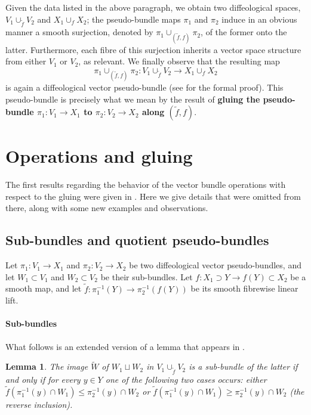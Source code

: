 \documentclass{article}
\newtheorem{lemma}{Lemma}[section]
\begin{document}
Given the data listed in the above paragraph, we obtain two diffeological spaces, $V_1\cup_{\tilde{f}}V_2$ and $X_1\cup_f X_2$; the pseudo-bundle maps $\pi_1$ and $\pi_2$ induce in an obvious
manner a smooth surjection, denoted by $\pi_1\cup_{(\tilde{f},f)}\pi_2$, of the former onto the latter. Furthermore, each fibre of this surjection inherits a vector space structure from either $V_1$ or $V_2$, as 
relevant. We finally observe that the resulting map
$$\pi_1\cup_{(\tilde{f},f)}\pi_2:V_1\cup_{\tilde{f}}V_2\to X_1\cup_f X_2$$ is again a diffeological vector pseudo-bundle (see \cite{pseudobundles} for the formal proof). This pseudo-bundle is precisely what 
we mean by the result of \textbf{gluing the pseudo-bundle $\pi_1:V_1\to X_1$ to $\pi_2:V_2\to X_2$ along $(\tilde{f},f)$}.



\section{Operations and gluing}

The first results regarding the behavior of the vector bundle operations with respect to the gluing were given in \cite{pseudobundles}. Here we give details that were omitted from there, along with some new 
examples and observations.

\subsection{Sub-bundles and quotient pseudo-bundles}

Let $\pi_1:V_1\to X_1$ and $\pi_2:V_2\to X_2$ be two diffeological vector pseudo-bundles, and let $W_1\subset V_1$ and $W_2\subset V_2$ be their sub-bundles. Let $f:X_1\supset Y\to f(Y)\subset X_2$ be 
a smooth map, and let $\tilde{f}:\pi_1^{-1}(Y)\to\pi_2^{-1}(f(Y))$ be its smooth fibrewise linear lift.

\paragraph{Sub-bundles} What follows is an extended version of a lemma that appears in \cite{pseudobundles}.

\begin{lemma}
The image $\tilde{W}$ of $W_1\sqcup W_2$ in $V_1\cup_{\tilde{f}}V_2$ is a sub-bundle of the latter if and only if for every $y\in Y$ one of the following two cases occurs: either
$\tilde{f}(\pi_1^{-1}(y)\cap W_1)\leqslant\pi_2^{-1}(y)\cap W_2$ or $\tilde{f}(\pi_1^{-1}(y)\cap W_1)\geqslant\pi_2^{-1}(y)\cap W_2$ (the reverse inclusion).
\end{lemma}
\end{document}
